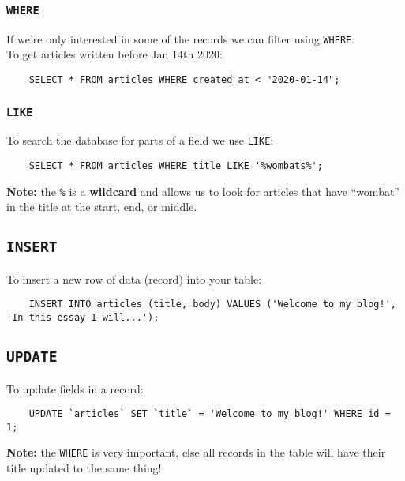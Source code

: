 \subsubsection{\texttt{WHERE}}

If we're only interested in some of the records we can filter using \texttt{WHERE}.
\\

To get articles written before Jan 14th 2020:

\begin{verbatim}
    SELECT * FROM articles WHERE created_at < "2020-01-14";
\end{verbatim}

\subsubsection{\texttt{LIKE}}

To search the database for parts of a field we use \texttt{LIKE}:

\begin{verbatim}
    SELECT * FROM articles WHERE title LIKE '%wombats%';
\end{verbatim}

\textbf{Note:} the \texttt{\%} is a \textbf{wildcard} and allows us to look for articles that have ``wombat'' in the title at the start, end, or middle.

\subsection{\texttt{INSERT}}

To insert a new row of data (record) into your table:

\begin{verbatim}
    INSERT INTO articles (title, body) VALUES ('Welcome to my blog!', 'In this essay I will...');
\end{verbatim}


\subsection{\texttt{UPDATE}}

To update fields in a record:

\begin{verbatim}
    UPDATE `articles` SET `title` = 'Welcome to my blog!' WHERE id = 1;
\end{verbatim}

\textbf{Note:} the \texttt{WHERE} is very important, else all records in the table will have their title updated to the same thing!

